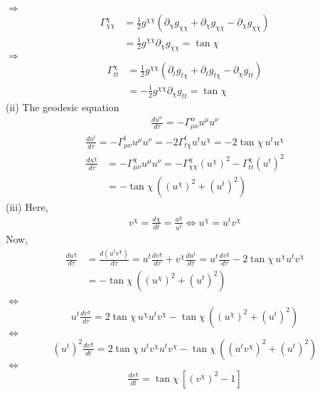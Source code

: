\documentclass[12pt]{article}
\begin{document}
$\Rightarrow$
\begin{align}
\Gamma^{\chi}_{\chi \chi} &= \frac{1}{2} g^{\chi \chi} \left(\partial_{\chi} g_{\chi \chi} + \partial_{\chi} g_{\chi \chi} - \partial_{\chi} g_{\chi \chi} \right) \\
&= \frac{1}{2} g^{\chi \chi} \partial_{\chi} g_{\chi \chi} = \tan{\chi}
\end{align}
$\Rightarrow$
\begin{align}
\Gamma^{\chi}_{t t} &= \frac{1}{2} g^{\chi \chi} \left(\partial_{t} g_{t \chi} + \partial_{t} g_{t \chi} - \partial_{\chi} g_{t t} \right) \\
&= - \frac{1}{2} g^{\chi \chi} \partial_{\chi} g_{t t} = \tan{\chi}
\end{align}
(ii) The geodesic equation
\begin{align}
\frac{d u^{\alpha}}{d \tau} = - \Gamma^{\alpha}_{\mu \nu} u^{\mu} u^{\nu}
\end{align}
\begin{align}
\frac{d u^{t}}{d \tau} = - \Gamma^{t}_{\mu \nu} u^{\mu} u^{\nu} = - 2 \Gamma^{t}_{t \chi} u^{t} u^{\chi} = - 2 \tan{\chi} \, u^{t} u^{\chi}
\end{align}
\begin{align}
\frac{d u^{\chi}}{d \tau} &= - \Gamma^{\chi}_{\mu \nu} u^{\mu} u^{\nu} = - \Gamma^{\chi}_{\chi \chi} (u^{\chi})^2 - \Gamma^{\chi}_{t t} (u^{t})^2 \\
&= - \tan{\chi} \, \left((u^{\chi})^2 + (u^{t})^2\right)
\end{align}
(iii) Here,
\begin{align}
v^{\chi} = \frac{d \chi}{d t} = \frac{u^{\chi}}{u^{t}} \Leftrightarrow u^{\chi} = u^{t} v^{\chi}
\end{align}
Now,
\begin{align}
\frac{d u^{\chi}}{d \tau} &= \frac{d  \left(u^{t}v^{\chi}\right)}{d \tau} = u^{t} \frac{d  v^{\chi}}{d \tau} +  v^{\chi} \frac{d  u^{t}}{d \tau}
= u^{t} \frac{d  v^{\chi}}{d \tau} - 2 \tan{\chi} \, u^{\chi} u^{t} v^{\chi} \\
&= - \tan{\chi} \, \left((u^{\chi})^2 + (u^{t})^2\right) \\
\end{align}
$\Leftrightarrow$
\begin{align}
u^{t} \frac{d  v^{\chi}}{d \tau} = 2 \tan{\chi} \, u^{\chi} u^{t} v^{\chi} - \tan{\chi} \, \left((u^{\chi})^2 + (u^{t})^2\right)
\end{align}
$\Leftrightarrow$
\begin{align}
(u^{t})^2 \frac{d  v^{\chi}}{d t} = 2 \tan{\chi} \, u^{t} v^{\chi} u^{t} v^{\chi} - \tan{\chi} \, \left((u^{t} v^{\chi})^2 + (u^{t})^2\right)
\end{align}
$\Leftrightarrow$
\begin{align}
\frac{d  v^{\chi}}{d t} = \tan{\chi} \, \left[(v^{\chi})^2 - 1\right]
\end{align}
\end{document}
